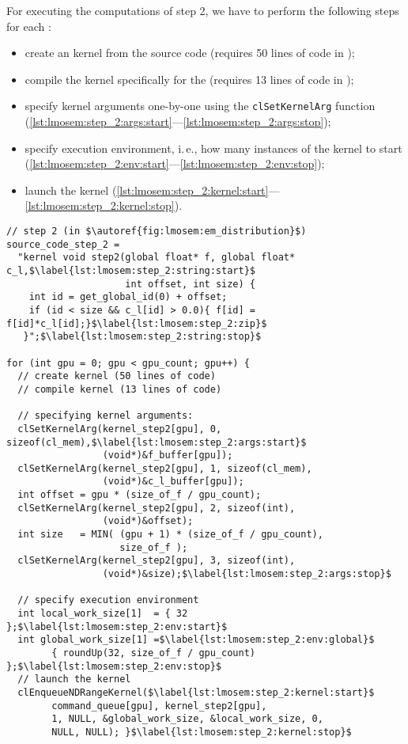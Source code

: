 For executing the computations of step 2, we have to perform the following steps for each \GPU:
\begin{itemize}
  \item create an \OpenCL kernel from the source code (requires 50 lines of code in \OpenCL);
  \item compile the kernel specifically for the \GPU (requires 13 lines of code in \OpenCL);
  \item specify kernel arguments one-by-one using the \texttt{clSetKernelArg} function (\autoref{lst:lmosem:step_2:args:start}---\autoref{lst:lmosem:step_2:args:stop});
  \item specify execution environment, i.\,e., how many instances of the kernel to start (\autoref{lst:lmosem:step_2:env:start}---\autoref{lst:lmosem:step_2:env:stop});
  \item launch the kernel (\autoref{lst:lmosem:step_2:kernel:start}---\autoref{lst:lmosem:step_2:kernel:stop}).
\end{itemize}
\begin{lstlisting}[float,
  caption={[Implementation of step 2 of the LM OSEM in \OpenCL.]Implementation of step 2 in \OpenCL (omitting error checks for brevity).},
  label={lst:lmosem:step_2}]
// step 2 (in $\autoref{fig:lmosem:em_distribution}$)
source_code_step_2 =
  "kernel void step2(global float* f, global float* c_l,$\label{lst:lmosem:step_2:string:start}$
                     int offset, int size) {
    int id = get_global_id(0) + offset;
    if (id < size && c_l[id] > 0.0){ f[id] = f[id]*c_l[id];}$\label{lst:lmosem:step_2:zip}$
   }";$\label{lst:lmosem:step_2:string:stop}$

for (int gpu = 0; gpu < gpu_count; gpu++) {
  // create kernel (50 lines of code)
  // compile kernel (13 lines of code)

  // specifying kernel arguments:
  clSetKernelArg(kernel_step2[gpu], 0, sizeof(cl_mem),$\label{lst:lmosem:step_2:args:start}$
                 (void*)&f_buffer[gpu]);
  clSetKernelArg(kernel_step2[gpu], 1, sizeof(cl_mem),
                 (void*)&c_l_buffer[gpu]);
  int offset = gpu * (size_of_f / gpu_count);
  clSetKernelArg(kernel_step2[gpu], 2, sizeof(int),
                 (void*)&offset);
  int size   = MIN( (gpu + 1) * (size_of_f / gpu_count),
                    size_of_f );
  clSetKernelArg(kernel_step2[gpu], 3, sizeof(int),
                 (void*)&size);$\label{lst:lmosem:step_2:args:stop}$

  // specify execution environment
  int local_work_size[1]  = { 32 };$\label{lst:lmosem:step_2:env:start}$
  int global_work_size[1] =$\label{lst:lmosem:step_2:env:global}$
        { roundUp(32, size_of_f / gpu_count) };$\label{lst:lmosem:step_2:env:stop}$
  // launch the kernel
  clEnqueueNDRangeKernel($\label{lst:lmosem:step_2:kernel:start}$
        command_queue[gpu], kernel_step2[gpu],
        1, NULL, &global_work_size, &local_work_size, 0,
        NULL, NULL); }$\label{lst:lmosem:step_2:kernel:stop}$
\end{lstlisting}


